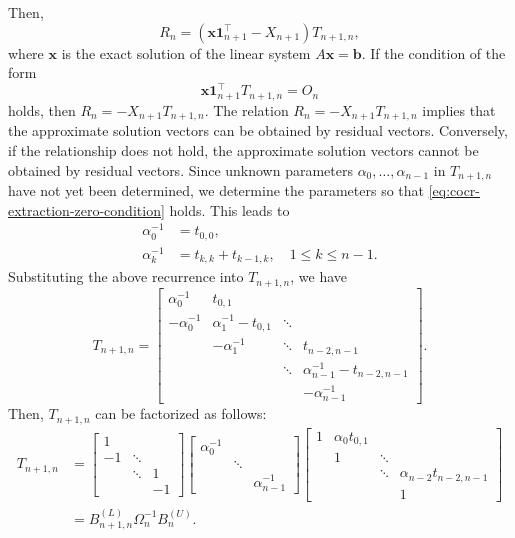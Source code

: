 {Then,}
\[R_n=(\bm x\bm1_{n+1}^{\top}-X_{n+1})T_{n+1,n},\]
{where $\bm x$ is the exact solution of the linear system $A\bm x=\bm b$. If the condition of the form}
\begin{equation}\label{eq:cocr-extraction-zero-condition}\bm x\bm1_{n+1}^{\top}T_{n+1,n}=O_n\end{equation}
{holds, then $R_n=-X_{n+1}T_{n+1,n}$. The relation $R_n=-X_{n+1}T_{n+1,n}$ implies that the approximate solution vectors can be obtained by residual vectors. Conversely, if the relationship does not hold, the approximate solution vectors cannot be obtained by residual vectors.}
{Since unknown parameters $\alpha_0,\ldots,\alpha_{n-1}$ in $T_{n+1,n}$ have not yet been determined, we determine the parameters so that \eqref{eq:cocr-extraction-zero-condition} holds. This leads to}
\[\begin{aligned}\alpha_0^{-1}&=t_{0,0},\\\alpha_k^{-1}&=t_{k,k}+t_{k-1,k},\quad1\le k\le n-1.\end{aligned}\]
{Substituting the above recurrence into $T_{n+1,n}$, we have}
\[T_{n+1,n}=\begin{bmatrix}\alpha_0^{-1}&t_{0,1}&&\\-\alpha_0^{-1}&\alpha_1^{-1}-t_{0,1}&\ddots&\\&-\alpha_1^{-1}&\ddots&t_{n-2,n-1}\\&&\ddots&\alpha_{n-1}^{-1}-t_{n-2,n-1}\\&&&-\alpha_{n-1}^{-1}\end{bmatrix}.\]
{Then, $T_{n+1,n}$ can be factorized as follows:}
\[\begin{aligned}
T_{n+1,n}&=\begin{bmatrix}1&&\\-1&\ddots&\\&\ddots&1\\&&-1\end{bmatrix}
\begin{bmatrix}\alpha_0^{-1}&&\\&\ddots&\\&&\alpha_{n-1}^{-1}\end{bmatrix}
\begin{bmatrix}1&\alpha_0t_{0,1}&&\\&1&\ddots&\\&&\ddots&\alpha_{n-2}t_{n-2,n-1}\\&&&1\end{bmatrix}\\
&=B_{n+1,n}^{(L)}\Omega_n^{-1}B_n^{(U)}.
\end{aligned}\]
